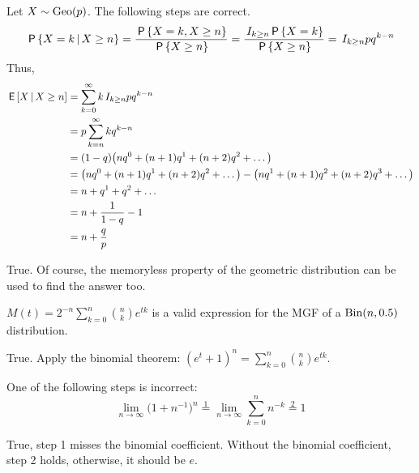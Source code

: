 \documentclass[tf-tutorial-all.tex]{subfiles}
\begin{document}

\begin{truefalse}
  Let $X \sim \mathrm{Geo}(p)$. The following steps are correct.
  \begin{equation*}
    \,\mathsf{P}\left\{X = k \,\middle|\, X \geq n\right\}
    = \frac{\,\mathsf{P}\left\{X=k, X \geq n\right\}}{\,\mathsf{P}\left\{X \geq n\right\}}
    = \frac{\,I_{k \geq n} \,\mathsf{P}\left\{X = k\right\}}{\,\mathsf{P}\left\{X \geq n\right\}}
    = \,I_{k \geq n} pq^{k-n}
  \end{equation*}
  Thus,
  \begin{align*}
    \,\mathsf{E}\left[X \,\middle|\, X \geq n\right] &= \sum_{k=0}^\infty k \,I_{k \geq n} pq^{k-n}\\
    &=  p \sum_{k=n}^\infty kq^{k-n}\\
    &= (1 - q) \big(n q^0 + (n+1) q^1 + (n+2) q^2 + \dots\big)\\
    &= \big(n q^0 + (n+1) q^1 + (n+2) q^2 + \dots\big) - \big(n q^1 + (n+1)q^2 + (n+2)q^3 + \dots\big)\\
    &= n + q^1 + q^2 + \dots\\
    &= n + \frac{1}{1-q} - 1\\
    &= n + \frac{q}{p}\\
  \end{align*}
\begin{solution}
    True. Of course, the memoryless property of the geometric
    distribution can be used to find the answer too. 
\end{solution}
\end{truefalse}


\begin{truefalse}
  $M(t) = 2^{-n} \sum_{k=0}^n \binom{n}{k} e^{tk}$ is a valid expression for the MGF of a $\mathrm{Bin}(n, 0.5)$ distribution.
\begin{solution}
True. Apply the binomial theorem: $(e^t + 1)^n = \sum_{k=0}^n \binom{n}{k} e^{tk}$.
\end{solution}
\end{truefalse}

\begin{truefalse}
  One of the following steps is incorrect:
  \begin{equation*}
    \lim_{n\to\infty} \big(1+n^{-1}\big)^n
    \stackrel{1} = \lim_{n\to\infty} \sum^n_{k=0} n^{-k}
    \stackrel{2} = 1
  \end{equation*}
\begin{solution}
True, step 1 misses the binomial coefficient. Without the binomial
coefficient, step 2 holds, otherwise, it should be $e$.
\end{solution}
\end{truefalse}
\end{document}
